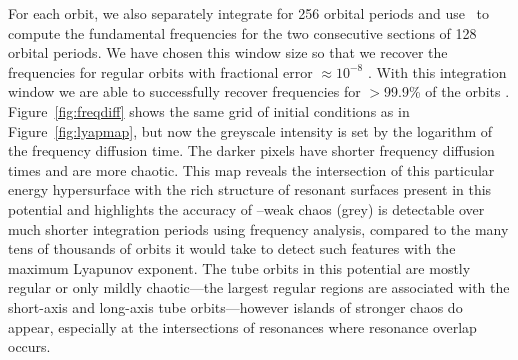 For each orbit, we also separately integrate for 256 orbital periods and use
\superfreq\ to compute the fundamental frequencies for the two consecutive
sections of 128 orbital periods. We have chosen this window size so that we
recover the frequencies for regular orbits with fractional error
$\approx10^{-8}$ \citep[we estimate the error in frequency recovery using the
method described in][]{laskar93}. With this integration window we are able to
successfully recover frequencies for $>$99.9\% of the orbits \superfreq.
Figure~\ref{fig:freqdiff} shows the same grid of initial conditions as in
Figure~\ref{fig:lyapmap}, but now the greyscale intensity is set by the
logarithm of the frequency diffusion time. The darker pixels have shorter
frequency diffusion times and are more chaotic. This map reveals the
intersection of this particular energy hypersurface with the rich structure of
resonant surfaces present in this potential and highlights the accuracy of
\superfreq\---weak chaos (grey) is detectable over much shorter integration
periods using frequency analysis, compared to the many tens of thousands of
orbits it would take to detect such features with the maximum Lyapunov exponent.
The tube orbits in this potential are mostly regular or only mildly
chaotic---the largest regular regions are associated with the short-axis and
long-axis tube orbits---however islands of stronger chaos do appear, especially
at the intersections of resonances where resonance overlap occurs.

